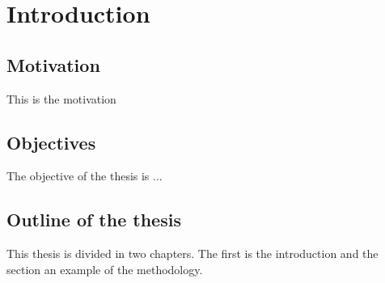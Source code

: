 
\chapter{Introduction}
\label{chap:intro}


\section{Motivation}
\label{sec:intro:motivation}

This is the motivation



\section{Objectives}
\label{sec:intro:objectives}

The objective of the thesis is ...


\section{Outline of the thesis}
\label{sec:intro:outline}

This thesis is divided in two chapters.
The first is the introduction and the section
an example of the methodology.


